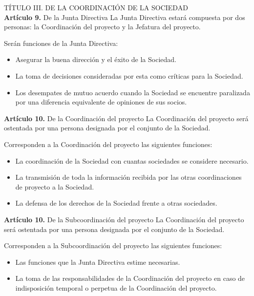 TÍTULO III. DE LA COORDINACIÓN DE LA SOCIEDAD\\
\textbf{Artículo 9.} De la Junta Directiva
La Junta Directiva estará compuesta por dos personas: la Coordinación del proyecto y la Jefatura del proyecto. 

Serán funciones de la Junta Directiva:
\begin{itemize}
    \item Asegurar la buena dirección y el éxito de la Sociedad. 
    \item La toma de decisiones consideradas por esta como críticas para la Sociedad. 
    \item Los desempates de mutuo acuerdo cuando la Sociedad se encuentre paralizada por una diferencia equivalente de opiniones de sus socios.
\end{itemize}

\textbf{Artículo 10.} De la Coordinación del proyecto
La Coordinación del proyecto será ostentada por una persona designada por el conjunto de la Sociedad.

Corresponden a la Coordinación del proyecto las siguientes funciones: 
\begin{itemize}
    \item La coordinación de la Sociedad con cuantas sociedades se considere necesario.
    \item La transmisión de toda la información recibida por las otras coordinaciones de proyecto a la Sociedad.
    \item La defensa de los derechos de la Sociedad frente a otras sociedades.
\end{itemize}

\textbf{Artículo 10.} De la Subcoordinación del proyecto
La Coordinación del proyecto será ostentada por una persona designada por el conjunto de la Sociedad.

Corresponden a la Subcoordinación del proyecto las siguientes funciones: 
\begin{itemize}
    \item Las funciones que la Junta Directiva estime necesarias.
    \item La toma de las responsabilidades de la Coordinación del proyecto en caso de indisposición temporal o perpetua de la Coordinación del proyecto.
\end{itemize}

